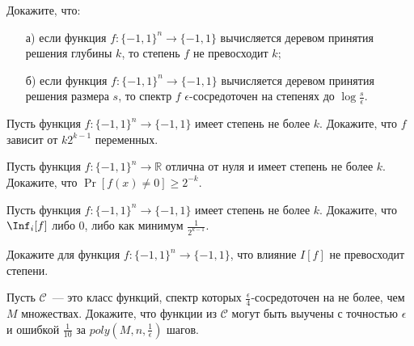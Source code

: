 \begin{task}
    Докажите, что:
    \begin{enumerate}[topsep = 0pt, itemsep = -1ex]
        \item [а)] если функция $f: \{-1, 1\}^n \to \{-1, 1\}$ вычисляется деревом принятия решения глубины $k$, то степень $f$ не
			превосходит $k$;
        \item [б)] если функция $f: \{-1, 1\}^n \to \{-1,1\}$ вычисляется деревом принятия решения размера $s$, то спектр $f$
			$\epsilon$-сосредоточен на степенях до $\log{\frac{s}{\epsilon}}$.
	\end{enumerate}
\end{task}


\begin{task}
	Пусть функция $f:\{-1, 1\}^n \to \{-1, 1\}$ имеет степень не более $k$. Докажите, что $f$ зависит от $k 2^{k - 1}$
    переменных.
\end{task}


\begin{task}
	Пусть функция $f: \{-1, 1\}^n \to \mathbb{R}$ отлична от нуля и имеет степень не более $k$. Докажите, что $\Pr[f(x) \neq 0] \ge 2^{-k}$.
\end{task}


\begin{task}
    Пусть функция $f: \{-1, 1\}^n \to \{-1, 1\}$ имеет степень не более $k$. Докажите, что $\Inf_i[f]$ либо $0$, либо как минимум
    $\frac{1}{2^{k - 1}}$.
\end{task}


\begin{task}
    Докажите для функция $f: \{-1, 1\}^n \to \{-1, 1\}$, что влияние $I[f]$ не превосходит степени.
\end{task}


\begin{task}
    Пусть $\mathcal{C}$~--- это класс функций, спектр которых $\frac{\epsilon}{4}$-сосредоточен на не более, чем $M$
    множествах. Докажите, что функции из $\mathcal{C}$ могут быть выучены с точностью $\epsilon$ и ошибкой $\frac{1}{10}$ за
    $poly(M, n, \frac{1}{\epsilon})$ шагов.
\end{task}


